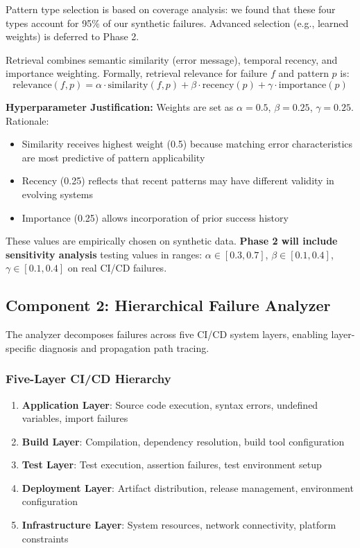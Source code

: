 \documentclass[11pt]{article}
\begin{document}
Pattern type selection is based on coverage analysis: we found that these four types account for 95\% of our synthetic failures. Advanced selection (e.g., learned weights) is deferred to Phase 2.

Retrieval combines semantic similarity (error message), temporal recency, and importance weighting. Formally, retrieval relevance for failure $f$ and pattern $p$ is:
\begin{equation}
\text{relevance}(f, p) = \alpha \cdot \text{similarity}(f, p) + \beta \cdot \text{recency}(p) + \gamma \cdot \text{importance}(p)
\end{equation}

\textbf{Hyperparameter Justification:} Weights are set as $\alpha=0.5$, $\beta=0.25$, $\gamma=0.25$. Rationale:
\begin{itemize}
    \item Similarity receives highest weight (0.5) because matching error characteristics are most predictive of pattern applicability
    \item Recency (0.25) reflects that recent patterns may have different validity in evolving systems
    \item Importance (0.25) allows incorporation of prior success history
\end{itemize}

These values are empirically chosen on synthetic data. \textbf{Phase 2 will include sensitivity analysis} testing values in ranges: $\alpha \in [0.3, 0.7]$, $\beta \in [0.1, 0.4]$, $\gamma \in [0.1, 0.4]$ on real CI/CD failures.

\subsection{Component 2: Hierarchical Failure Analyzer}

The analyzer decomposes failures across five CI/CD system layers, enabling layer-specific diagnosis and propagation path tracing.

\subsubsection{Five-Layer CI/CD Hierarchy}

\begin{enumerate}
    \item \textbf{Application Layer}: Source code execution, syntax errors, undefined variables, import failures
    \item \textbf{Build Layer}: Compilation, dependency resolution, build tool configuration
    \item \textbf{Test Layer}: Test execution, assertion failures, test environment setup
    \item \textbf{Deployment Layer}: Artifact distribution, release management, environment configuration
    \item \textbf{Infrastructure Layer}: System resources, network connectivity, platform constraints
\end{enumerate}
\end{document}
